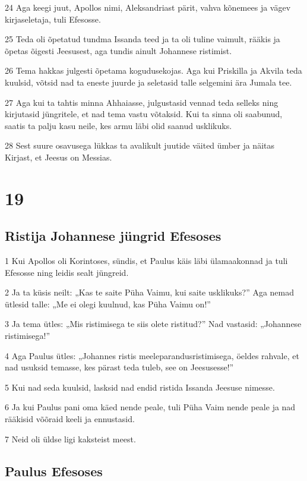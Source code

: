 \par 24 Aga keegi juut, Apollos nimi, Aleksandriast pärit, vahva kõnemees ja vägev kirjaseletaja, tuli Efesosse.
\par 25 Teda oli õpetatud tundma Issanda teed ja ta oli tuline vaimult, rääkis ja õpetas õigesti Jeesusest, aga tundis ainult Johannese ristimist.
\par 26 Tema hakkas julgesti õpetama kogudusekojas. Aga kui Priskilla ja Akvila teda kuulsid, võtsid nad ta eneste juurde ja seletasid talle selgemini ära Jumala tee.
\par 27 Aga kui ta tahtis minna Ahhaiasse, julgustasid vennad teda selleks ning kirjutasid jüngritele, et nad tema vastu võtaksid. Kui ta sinna oli saabunud, saatis ta palju kasu neile, kes armu läbi olid saanud usklikuks.
\par 28 Sest suure osavusega lükkas ta avalikult juutide väited ümber ja näitas Kirjast, et Jeesus on Messias.


\chapter{19}

\section*{Ristija Johannese jüngrid Efesoses}

\par 1 Kui Apollos oli Korintoses, sündis, et Paulus käis läbi ülamaakonnad ja tuli Efesosse ning leidis sealt jüngreid.
\par 2 Ja ta küsis neilt: „Kas te saite Püha Vaimu, kui saite usklikuks?” Aga nemad ütlesid talle: „Me ei olegi kuulnud, kas Püha Vaimu on!”
\par 3 Ja tema ütles: „Mis ristimisega te siis olete ristitud?” Nad vastasid: „Johannese ristimisega!”
\par 4 Aga Paulus ütles: „Johannes ristis meeleparandusristimisega, öeldes rahvale, et nad usuksid temasse, kes pärast teda tuleb, see on Jeesusesse!”
\par 5 Kui nad seda kuulsid, lasksid nad endid ristida Issanda Jeesuse nimesse.
\par 6 Ja kui Paulus pani oma käed nende peale, tuli Püha Vaim nende peale ja nad rääkisid võõraid keeli ja ennustasid.
\par 7 Neid oli üldse ligi kaksteist meest.

\section*{Paulus Efesoses}

